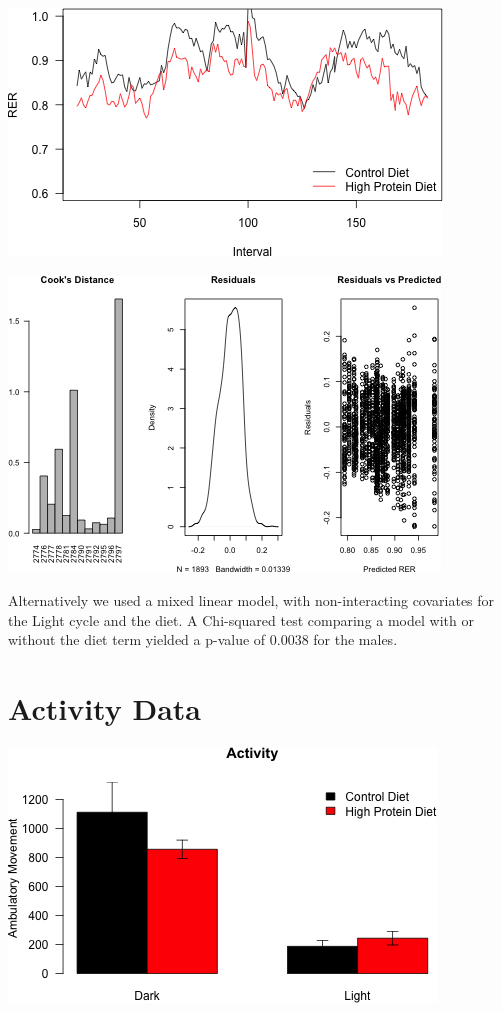 \documentclass[]{article}
\begin{document}
\includegraphics{figures/rer-time-course-1.png}

\includegraphics{figures/rer-statistics-untreated-1.png}

Alternatively we used a mixed linear model, with non-interacting
covariates for the Light cycle and the diet. A Chi-squared test
comparing a model with or without the diet term yielded a p-value of
0.0038 for the males.

\section{Activity Data}\label{activity-data}

\includegraphics{figures/activity-1.png}
\end{document}

